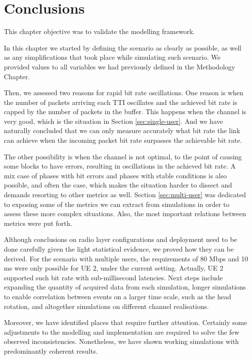 \section*{Conclusions}

This chapter objective was to validate the modelling framework.

In this chapter we started by defining the scenario as clearly as possible, as well as any simplifications that took place while simulating such scenario. We provided values to all variables we had previously defined in the Methodology Chapter.

Then, we assessed two reasons for rapid bit rate oscillations. One reason is when the number of packets arriving each TTI oscillates and the achieved bit rate is capped by the number of packets in the buffer. This happens when the channel is very good, which is the situation in Section \ref{sec:single-user}. And we have naturally concluded that we can only measure accurately what bit rate the link can achieve when the incoming packet bit rate surpasses the achievable bit rate.

The other possibility is when the channel is not optimal, to the point of causing some blocks to have errors, resulting in oscillations in the achieved bit rate. A mix case of phases with bit errors and phases with stable conditions is also possible, and often the case, which makes the situation harder to dissect and demands resorting to other metrics as well. Section \ref{sec:multi-user} was dedicated to exposing some of the metrics we can extract from simulations in order to assess these more complex situations. Also, the most important relations between metrics were put forth.

Although conclusions on radio layer configurations and deployment need to be done carefully given the light statistical evidence, we proved how they can be derived. For the scenario with multiple users, the requirements of 80 Mbps and 10 ms were only possible for UE 2, under the current setting. Actually, UE 2 supported such bit rate with sub-millisecond latencies. Next steps include expanding the quantity of acquired data from each simulation, longer simulations to enable correlation between events on a larger time scale, such as the head rotation, and altogether simulations on different channel realisations. 

Moreover, we have identified places that require further attention. Certainly some adjustments to the modelling and implementation are required to solve the few observed inconsistencies. Nonetheless, we have shown working simulations with predominantly coherent results. 


